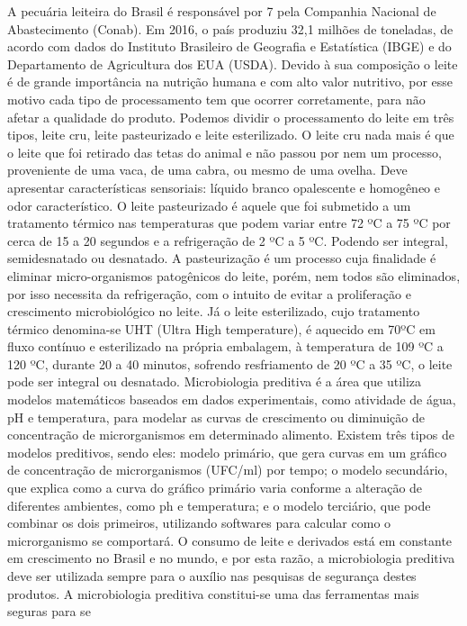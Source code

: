 A pecuária leiteira do Brasil é responsável por 7%
pela Companhia Nacional de Abastecimento (Conab). Em 2016, o país produziu 32,1 milhões de
toneladas, de acordo com dados do Instituto Brasileiro de Geografia e Estatística (IBGE) e do
Departamento de Agricultura dos EUA (USDA). Devido à sua composição o leite é de grande
importância na nutrição humana e com alto valor nutritivo, por esse motivo cada tipo de
processamento tem que ocorrer corretamente, para não afetar a qualidade do produto. Podemos
dividir o processamento do leite em três tipos, leite cru, leite pasteurizado e leite esterilizado. O
leite cru nada mais é que o leite que foi retirado das tetas do animal e não passou por nem um
processo, proveniente de uma vaca, de uma cabra, ou mesmo de uma ovelha. Deve apresentar
características sensoriais: líquido branco opalescente e homogêneo e odor característico. O leite
pasteurizado é aquele que foi submetido a um tratamento térmico nas temperaturas que podem
variar entre 72 ºC a 75 ºC por cerca de 15 a 20 segundos e a refrigeração de 2 ºC a 5 ºC. Podendo
ser integral, semidesnatado ou desnatado. A pasteurização é um processo cuja finalidade é
eliminar micro-organismos patogênicos do leite, porém, nem todos são eliminados, por isso
necessita da refrigeração, com o intuito de evitar a proliferação e crescimento microbiológico no
leite. Já o leite esterilizado, cujo tratamento térmico denomina-se UHT (Ultra High temperature),
é aquecido em 70ºC em fluxo contínuo e esterilizado na própria embalagem, à temperatura de
109 ºC a 120 ºC, durante 20 a 40 minutos, sofrendo resfriamento de 20 ºC a 35 ºC, o leite pode
ser integral ou desnatado. Microbiologia preditiva é a área que utiliza modelos matemáticos
baseados em dados experimentais, como atividade de água, pH e temperatura, para modelar as
curvas de crescimento ou diminuição de concentração de microrganismos em determinado
alimento. Existem três tipos de modelos preditivos, sendo eles: modelo primário, que gera curvas
em um gráfico de concentração de microrganismos (UFC/ml) por tempo; o modelo secundário,
que explica como a curva do gráfico primário varia conforme a alteração de diferentes
ambientes, como ph e temperatura; e o modelo terciário, que pode combinar os dois primeiros,
utilizando softwares para calcular como o microrganismo se comportará. O consumo de leite e
derivados está em constante em crescimento no Brasil e no mundo, e por esta razão, a
microbiologia preditiva deve ser utilizada sempre para o auxílio nas pesquisas de segurança
destes produtos. A microbiologia preditiva constitui-se uma das ferramentas mais seguras para se
